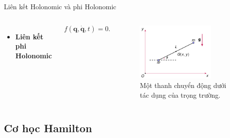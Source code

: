 \begin{frame}{Liên kết Holonomic và phi Holonomic}
\begin{columns}
    \begin{itemize}
        \item\textbf{Liên kết phi Holonomic}
    \end{itemize}
    \begin{equation}
        f \left( \mathbf{q}, \dot{\mathbf{q}}, t \right) = 0.
    \end{equation}
    \vspace{-9mm}
    \begin{figure}
        \centering
        \includegraphics[width=0.8\textwidth]{Figures/NonHolonomic_example.pdf}
        \vspace{-2mm}
        \caption{Một thanh chuyển động dưới tác dụng của trọng trường.}
    \end{figure}
\end{columns}
\end{frame}

\subsection{Cơ học Hamilton}


